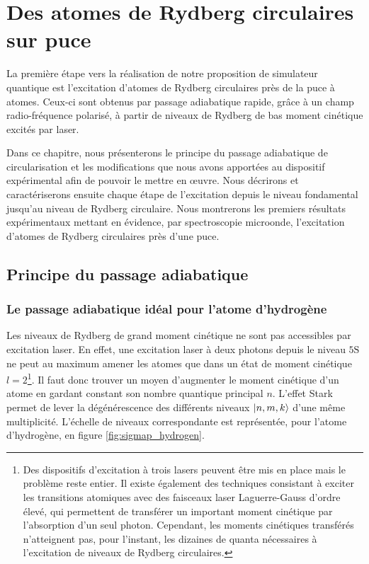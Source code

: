 \chapter{Des atomes de Rydberg circulaires sur puce}
\label{chapter:50c}
\vfill
\minitoc
\newpage

\noindent La première étape vers la réalisation de notre proposition de simulateur quantique est l'excitation d'atomes de Rydberg circulaires près de la puce à atomes.
Ceux-ci sont obtenus par passage adiabatique rapide, grâce à un champ radio-fréquence polarisé,  à partir de niveaux de Rydberg de bas moment cinétique excités par laser.

Dans ce chapitre, nous présenterons le principe du passage adiabatique de circularisation et les modifications que nous avons apportées au dispositif expérimental afin de pouvoir le mettre en \oe uvre.
Nous décrirons et caractériserons ensuite chaque étape de l'excitation depuis le niveau fondamental jusqu'au niveau de Rydberg circulaire.
Nous montrerons les premiers résultats expérimentaux mettant en évidence, par spectroscopie microonde, l'excitation d'atomes de Rydberg circulaires près d'une puce.

\section{Principe du passage adiabatique}
 \subsection{Le passage adiabatique idéal pour l'atome d'hydrogène}
\noindent Les niveaux de Rydberg de grand moment cinétique ne sont pas accessibles par excitation laser.
En effet, une excitation laser à deux photons depuis le niveau $\mathrm{5S}$ ne peut au maximum amener les atomes que dans un état de moment cinétique $l=2$\footnote{
Des dispositifs d'excitation à trois lasers peuvent être mis en place mais le problème reste entier.
Il existe également des techniques consistant à exciter les transitions atomiques avec des faisceaux laser Laguerre-Gauss d'ordre élevé, qui permettent de transférer un important moment cinétique par l'absorption d'un seul photon.
Cependant, les moments cinétiques transférés n'atteignent pas, pour l'instant, les dizaines de quanta nécessaires à l'excitation de niveaux de Rydberg circulaires.
}.
Il faut donc trouver un moyen d'augmenter le moment cinétique d'un atome en gardant constant son nombre quantique principal $n$.
L'effet Stark permet de lever la dégénérescence des différents niveaux $\ket{n,m,k}$ d'une même multiplicité.
L'échelle de niveaux correspondante est représentée, pour l'atome d'hydrogène, en figure \eqref{fig:sigmap_hydrogen}.

